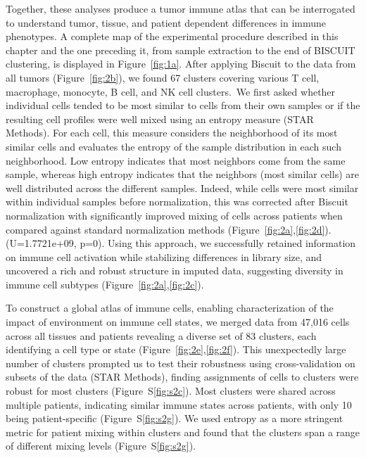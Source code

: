 Together, these analyses produce a tumor immune atlas that can be interrogated to understand tumor, tissue, and patient dependent differences in immune phenotypes.
A complete map of the experimental procedure described in this chapter and the one preceding it, from sample extraction to the end of BISCUIT clustering, is displayed in Figure~\ref{fig:1a}.
After applying Biscuit to the data from all tumors (Figure~\ref{fig:2b}), we found 67 clusters covering various T cell, macrophage, monocyte, B cell, and NK cell clusters.~We first asked whether individual cells tended to be most similar to cells from their own samples or if the resulting cell profiles were well mixed using an entropy measure (STAR Methods).
For each cell, this measure considers the neighborhood of its most similar cells and evaluates the entropy of the sample distribution in each such neighborhood.
Low entropy indicates that most neighbors come from the same sample, whereas high entropy indicates that the neighbors (most similar cells) are well distributed across the different samples.
Indeed, while cells were most similar within individual samples before normalization, this was corrected after Biscuit normalization with significantly improved mixing of cells across patients when compared against standard normalization methods (Figure~\ref{fig:2a},\ref{fig:2d}).
(U=1.7721e+09, p=0).
Using this approach, we successfully retained information on immune cell activation while stabilizing differences in library size, and uncovered a rich and robust structure in imputed data, suggesting diversity in immune cell subtypes (Figure~\ref{fig:2a},\ref{fig:2c}).

To construct a global atlas of immune cells, enabling characterization of the impact of environment on immune cell states, we merged data from 47,016 cells across all tissues and patients revealing a diverse set of 83 clusters, each identifying a cell type or state (Figure~\ref{fig:2e},\ref{fig:2f}).
This unexpectedly large number of clusters prompted us to test their robustness using cross-validation on subsets of the data (STAR Methods), finding assignments of cells to clusters were robust for most clusters (Figure~S\ref{fig:s2c}).
Most clusters were shared across multiple patients, indicating similar immune states across patients, with only 10 being patient-specific (Figure~S\ref{fig:s2g}).
We used entropy as a more stringent metric for patient mixing within clusters and found that the clusters span a range of different mixing levels (Figure~S\ref{fig:s2g}).

